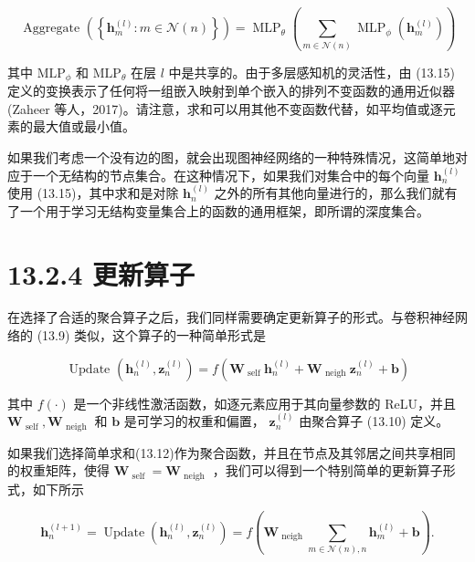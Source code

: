 \documentclass[10pt]{article}
\begin{document}
\[
\text{ Aggregate }\left( \left\{  {{\mathbf{h}}_{m}^{\left( l\right) } : m \in  \mathcal{N}\left( n\right) }\right\}  \right)  = {\operatorname{MLP}}_{\theta }\left( {\mathop{\sum }\limits_{{m \in  \mathcal{N}\left( n\right) }}{\operatorname{MLP}}_{\phi }\left( {\mathbf{h}}_{m}^{\left( l\right) }\right) }\right)  \tag{13.15}
\]

其中 \({\mathrm{{MLP}}}_{\phi }\) 和 \({\mathrm{{MLP}}}_{\theta }\) 在层 \(l\) 中是共享的。由于多层感知机的灵活性，由 (13.15) 定义的变换表示了任何将一组嵌入映射到单个嵌入的排列不变函数的通用近似器(Zaheer 等人，2017)。请注意，求和可以用其他不变函数代替，如平均值或逐元素的最大值或最小值。

如果我们考虑一个没有边的图，就会出现图神经网络的一种特殊情况，这简单地对应于一个无结构的节点集合。在这种情况下，如果我们对集合中的每个向量 \({\mathbf{h}}_{n}^{\left( l\right) }\) 使用 (13.15)，其中求和是对除 \({\mathbf{h}}_{n}^{\left( l\right) }\) 之外的所有其他向量进行的，那么我们就有了一个用于学习无结构变量集合上的函数的通用框架，即所谓的深度集合。

\section*{13.2.4 更新算子}

在选择了合适的聚合算子之后，我们同样需要确定更新算子的形式。与卷积神经网络的 (13.9) 类似，这个算子的一种简单形式是

\[
\text{ Update }\left( {{\mathbf{h}}_{n}^{\left( l\right) },{\mathbf{z}}_{n}^{\left( l\right) }}\right)  = f\left( {{\mathbf{W}}_{\text{ self }}{\mathbf{h}}_{n}^{\left( l\right) } + {\mathbf{W}}_{\text{ neigh }}{\mathbf{z}}_{n}^{\left( l\right) } + \mathbf{b}}\right)  \tag{13.16}
\]

其中 \(f\left( \cdot \right)\) 是一个非线性激活函数，如逐元素应用于其向量参数的 ReLU，并且 \({\mathbf{W}}_{\text{ self }},{\mathbf{W}}_{\text{ neigh }}\) 和 \(\mathbf{b}\) 是可学习的权重和偏置， \({\mathbf{z}}_{n}^{\left( l\right) }\) 由聚合算子 (13.10) 定义。

如果我们选择简单求和(13.12)作为聚合函数，并且在节点及其邻居之间共享相同的权重矩阵，使得 \({\mathbf{W}}_{\text{ self }} = {\mathbf{W}}_{\text{ neigh }}\) ，我们可以得到一个特别简单的更新算子形式，如下所示

\[
{\mathbf{h}}_{n}^{\left( l + 1\right) } = \operatorname{Update}\left( {{\mathbf{h}}_{n}^{\left( l\right) },{\mathbf{z}}_{n}^{\left( l\right) }}\right)  = f\left( {{\mathbf{W}}_{\text{ neigh }}\mathop{\sum }\limits_{{m \in  \mathcal{N}\left( n\right) ,n}}{\mathbf{h}}_{m}^{\left( l\right) } + \mathbf{b}}\right) . \tag{13.17}
\]
\end{document}
